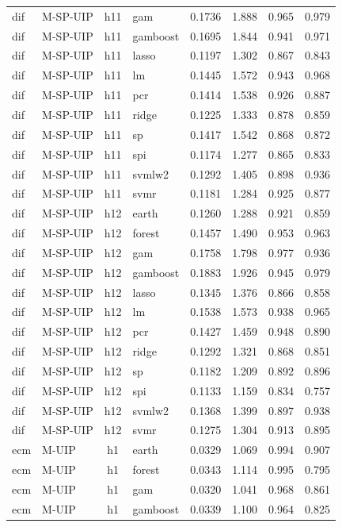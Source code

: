 \begin{ThreePartTable}
\begin{longtable}[t]{llclcccc}
dif & M-SP-UIP & h11 & gam & 0.1736 & 1.888 & 0.965 & 0.979\\
dif & M-SP-UIP & h11 & gamboost & 0.1695 & 1.844 & 0.941 & 0.971\\
dif & M-SP-UIP & h11 & lasso & 0.1197 & 1.302 & 0.867 & 0.843\\
dif & M-SP-UIP & h11 & lm & 0.1445 & 1.572 & 0.943 & 0.968\\
dif & M-SP-UIP & h11 & pcr & 0.1414 & 1.538 & 0.926 & 0.887\\
dif & M-SP-UIP & h11 & ridge & 0.1225 & 1.333 & 0.878 & 0.859\\
dif & M-SP-UIP & h11 & sp & 0.1417 & 1.542 & 0.868 & 0.872\\
dif & M-SP-UIP & h11 & spi & 0.1174 & 1.277 & 0.865 & 0.833\\
dif & M-SP-UIP & h11 & svmlw2 & 0.1292 & 1.405 & 0.898 & 0.936\\
dif & M-SP-UIP & h11 & svmr & 0.1181 & 1.284 & 0.925 & 0.877\\
\addlinespace
dif & M-SP-UIP & h12 & earth & 0.1260 & 1.288 & 0.921 & 0.859\\
dif & M-SP-UIP & h12 & forest & 0.1457 & 1.490 & 0.953 & 0.963\\
dif & M-SP-UIP & h12 & gam & 0.1758 & 1.798 & 0.977 & 0.936\\
dif & M-SP-UIP & h12 & gamboost & 0.1883 & 1.926 & 0.945 & 0.979\\
dif & M-SP-UIP & h12 & lasso & 0.1345 & 1.376 & 0.866 & 0.858\\
dif & M-SP-UIP & h12 & lm & 0.1538 & 1.573 & 0.938 & 0.965\\
dif & M-SP-UIP & h12 & pcr & 0.1427 & 1.459 & 0.948 & 0.890\\
dif & M-SP-UIP & h12 & ridge & 0.1292 & 1.321 & 0.868 & 0.851\\
dif & M-SP-UIP & h12 & sp & 0.1182 & 1.209 & 0.892 & 0.896\\
dif & M-SP-UIP & h12 & spi & 0.1133 & 1.159 & 0.834 & 0.757\\
dif & M-SP-UIP & h12 & svmlw2 & 0.1368 & 1.399 & 0.897 & 0.938\\
dif & M-SP-UIP & h12 & svmr & 0.1275 & 1.304 & 0.913 & 0.895\\
\addlinespace
ecm & M-UIP & h1 & earth & 0.0329 & 1.069 & 0.994 & 0.907\\
ecm & M-UIP & h1 & forest & 0.0343 & 1.114 & 0.995 & 0.795\\
ecm & M-UIP & h1 & gam & 0.0320 & 1.041 & 0.968 & 0.861\\
ecm & M-UIP & h1 & gamboost & 0.0339 & 1.100 & 0.964 & 0.825\\

\end{longtable}
\end{ThreePartTable}
